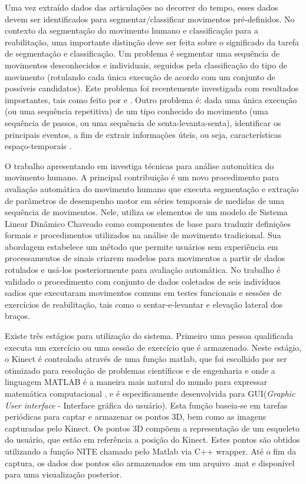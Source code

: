 Uma vez extraído dados das articulações no decorrer do tempo, esses dados devem ser identificados para segmentar/classificar movimentos pré-definidos.
  No contexto da segmentação do movimento humano e classificação para a reabilitação,
uma importante distinção deve ser feita sobre o significado da tarefa de segmentação e classificação.
Um problema é segmentar uma sequência de movimentos desconhecidos e
individuais, seguidos pela classificação do tipo de movimento (rotulando cada única
 execução de acordo com um conjunto de possíveis candidatos).
Este problema foi recentemente investigada com resultados importantes, tais como
feito por \cite{LinaAndDkulic} e \cite{PdeDios}. Outro problema é: dada uma única
execução (ou uma sequência repetitiva) de um tipo conhecido do movimento
 (uma sequência de passos, ou uma sequência de senta-levanta-senta), identificar os principais eventos,
a fim de extrair informações úteis, ou seja, características espaço-temporais \cite{roberto}.

O trabalho apresentando em \cite{roberto} investiga técnicas para análise automática
do movimento humano. A principal contribuição é um novo procedimento para avaliação
automática do movimento humano que executa segmentação e extração de parâmetros de
desempenho motor em séries temporais de medidas de uma sequência de movimentos. Nele,
utiliza os elementos de um modelo de Sistema Linear Dinâmico Chaveado como componentes
 de base para traduzir definições formais e procedimentos utilizados na análise de
movimento tradicional. Sua abordagem estabelece um método que permite usuários sem
experiência em processamentos de sinais criarem modelos para movimentos a partir de dados rotulados e usá-los posteriormente para avaliação automática. No trabalho é validado o
procedimento com conjunto de dados coletados de seis indivíduos sadios que executaram
movimentos comuns em testes funcionais e sessões de exercícios de reabilitação, tais como
o sentar-e-levantar e elevação lateral dos braços.

Existe três estágios para utilização do sistema. Primeiro uma pessoa qualificada
executa um exercício ou uma sessão de exercício que é armazenado. Neste estágio,
o Kinect é controlado através de uma função matlab, que foi escolhido por ser otimizado para resolução de problemas científicos e de engenharia e onde
 a linguagem MATLAB é a maneira mais natural do mundo para expressar matemática computacional \cite{matlab}, e é especificamente desenvolvida
para GUI(\textit{Graphic User interface} - Interface gráfica do usuário). Esta
função baseia-se em tarefas periódicas para captar e armazenar os pontos 3D, bem
como as imagens capturadas pelo Kinect. Os pontos 3D compõem a representação de
um esqueleto do usuário, que estão em referência a posição do Kinect. Estes pontos
são obtidos utilizando a função NITE \cite{openNI} chamado pelo Matlab via C++
wrapper. Até o fim da captura, os dados dos pontos são armazenados em um arquivo
.mat e disponível para uma visualização posterior.


